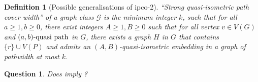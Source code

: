 \documentclass[a4paper]{article}
\newtheorem{Question}{Question}
\newtheorem{definition}{Definition}
\begin{document}
 \begin{definition}[Possible generalisations of ipco-2]\label{def:2}
 	``Strong quasi-isometric path cover width'' of a graph class $\mathcal{G}$ is the minimum integer $k$, such that for all $a\geq 1,b\geq 0$, there exist integers $A\geq 1,B\geq 0$ such that for all vertex $v\in V(G)$ and $(a,b)\text{-quasi path}$ in $G$, there exists a graph $H$ in $G$ that contains $\{r\}\cup V(P)$ and admits an $(A,B)$-quasi-isometric embedding in a graph of pathwidth at most $k$. 
 \end{definition}
 
 \begin{Question}
 	Does  imply ?
 \end{Question}
\end{document}

